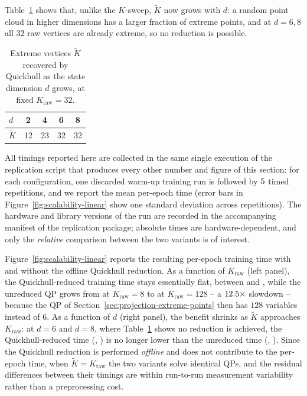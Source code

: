 \documentclass[11pt]{elsarticle}
\theoremstyle{definition}
\theoremstyle{remark}
\numberwithin{equation}{section}
\begin{document}
Table~\ref{tab:quickhull-d} shows that, unlike the $K$-sweep, $\widetilde{K}$
now grows with $d$: a random point cloud in higher dimensions has a larger
fraction of extreme points, and at $d=6,8$ all $32$ raw vertices are already
extreme, so no reduction is possible.

\begin{table}[htbp]
  \centering
  \begin{tabular}{lcccc}
    \toprule
    $d$             & 2  & 4  & 6  & 8  \\
    \midrule
    $\widetilde{K}$ & 12 & 23 & 32 & 32 \\
    \bottomrule
  \end{tabular}
  \caption{Extreme vertices $\widetilde{K}$ recovered by Quickhull as the
  state dimension $d$ grows, at fixed $K_{\mathrm{raw}}=32$.}
  \label{tab:quickhull-d}
\end{table}

All timings reported here are collected in the same single execution of the
replication script that produces every other number and figure of this
section: for each configuration, one discarded warm-up training run is
followed by $5$ timed repetitions, and we report the mean
per-epoch time (error bars in Figure~\ref{fig:scalability-linear} show one
standard deviation across repetitions). The hardware and library versions
of the run are recorded in the accompanying manifest of the replication
package; absolute times are hardware-dependent, and only the \emph{relative}
comparison between the two variants is of interest.

Figure~\ref{fig:scalability-linear} reports the resulting per-epoch training
time with and without the offline Quickhull reduction. As a function of
$K_{\mathrm{raw}}$ (left panel), the Quickhull-reduced training time stays
essentially flat, between \LCtimeQHmin{} and \LCtimeQHmax, while the
unreduced QP grows from \LCtimeNoQHfirst{} at $K_{\mathrm{raw}}=8$ to
\LCtimeNoQHlast{} at $K_{\mathrm{raw}}=128$ -- a $12.5\times$
slowdown -- because the QP of Section~\ref{sec:projection-extreme-points}
then has $128$ variables instead of $6$. As a function of $d$ (right panel),
the benefit shrinks as $\widetilde{K}$ approaches $K_{\mathrm{raw}}$: at
$d=6$ and $d=8$, where Table~\ref{tab:quickhull-d} shows no reduction is
achieved, the Quickhull-reduced time (\LCtimeQHdSix, \LCtimeQHdEight) is
no longer lower than the unreduced time (\LCtimeNoQHdSix,
\LCtimeNoQHdEight). Since the Quickhull reduction is performed
\emph{offline} and does not contribute to the per-epoch time, when
$\widetilde{K}=K_{\mathrm{raw}}$ the two variants solve identical QPs, and
the residual differences between their timings are within run-to-run
measurement variability rather than a preprocessing cost.
\end{document}
